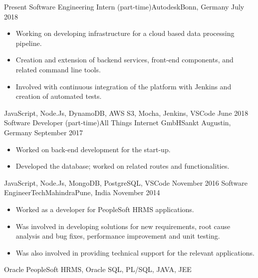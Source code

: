 %
%
%
\begin{experiences}
  \experience
    {Present}   {Software Engineering Intern (part-time)}{Autodesk}{Bonn, Germany}
    {July 2018} {
                      \begin{itemize}
                        \item Working on developing infrastructure for a cloud based data processing pipeline.
                        \item Creation and extension of backend services, front-end components, and related command line tools.
                        \item Involved with continuous integration of the platform with Jenkins and creation of automated tests.                               
                      \end{itemize}
                    }
                    {JavaScript, Node.Js, DynamoDB, AWS S3, Mocha, Jenkins, VSCode}
  \emptySeparator
  \experience
    {June 2018} {Software Developer (part-time)}{All Things Internet GmbH}{Sankt Augustin, Germany}
    {September 2017}    {
                      \begin{itemize}
                        \item Worked on back-end development for the start-up.
                        \item Developed the database; worked on related routes and functionalities.                   
                      \end{itemize}
                    }
                    {JavaScript, Node.Js, MongoDB, PostgreSQL, VSCode}
  \emptySeparator
  \experience
    {November 2016}     {Software Engineer}{TechMahindra}{Pune, India}
    {November 2014}    {
                      \begin{itemize}
                        \item Worked as a developer for PeopleSoft HRMS applications.
                        \item Was involved in developing solutions for new requirements, root cause analysis and bug fixes, performance improvement and unit testing.
                        \item Was also involved in providing technical support for the relevant applications.
                      \end{itemize}
                    }
                    {Oracle PeopleSoft HRMS, Oracle SQL, PL/SQL, JAVA, JEE}
\end{experiences}
